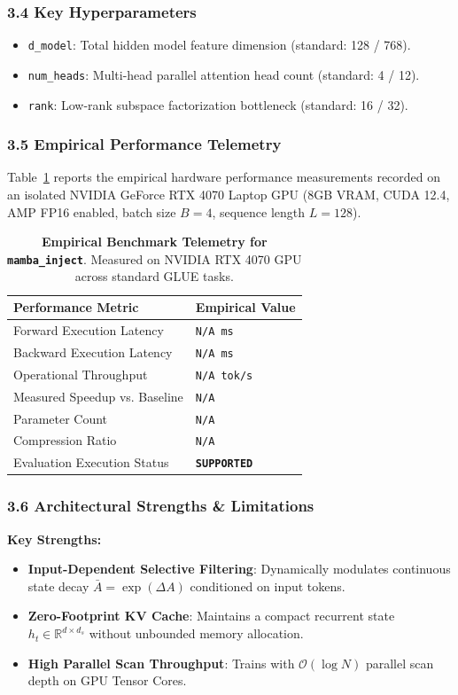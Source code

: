 \subsubsection*{3.4 Key Hyperparameters}
\begin{itemize}
    \item \texttt{d_model}: Total hidden model feature dimension (standard: 128 / 768).
    \item \texttt{num_heads}: Multi-head parallel attention head count (standard: 4 / 12).
    \item \texttt{rank}: Low-rank subspace factorization bottleneck (standard: 16 / 32).
\end{itemize}

\subsubsection*{3.5 Empirical Performance Telemetry}
Table~\ref{tab:telemetry_mamba\_inject} reports the empirical hardware performance measurements recorded on an isolated NVIDIA GeForce RTX 4070 Laptop GPU (8GB VRAM, CUDA 12.4, AMP FP16 enabled, batch size $B=4$, sequence length $L=128$).

\begin{table}[h]
\centering
\small
\caption{\textbf{Empirical Benchmark Telemetry for \texttt{mamba\_inject}}. Measured on NVIDIA RTX 4070 GPU across standard GLUE tasks.}
\label{tab:telemetry_mamba\_inject}
\begin{tabularx}{\columnwidth}{lX}
\toprule
\textbf{Performance Metric} & \textbf{Empirical Value} \\
\midrule
Forward Execution Latency & \texttt{N/A ms} \\
Backward Execution Latency & \texttt{N/A ms} \\
Operational Throughput & \texttt{N/A tok/s} \\
Measured Speedup vs. Baseline & \texttt{N/A} \\
Parameter Count & \texttt{N/A} \\
Compression Ratio & \texttt{N/A} \\
Evaluation Execution Status & \textbf{\texttt{SUPPORTED}} \\
\bottomrule
\end{tabularx}
\end{table}

\subsubsection*{3.6 Architectural Strengths \& Limitations}
\textbf{Key Strengths:}
\begin{itemize}
    \item \textbf{Input-Dependent Selective Filtering}: Dynamically modulates continuous state decay $\bar{A} = \exp(\Delta A)$ conditioned on input tokens.
    \item \textbf{Zero-Footprint KV Cache}: Maintains a compact recurrent state $h_t \in \mathbb{R}^{d \times d_s}$ without unbounded memory allocation.
    \item \textbf{High Parallel Scan Throughput}: Trains with $\mathcal{O}(\log N)$ parallel scan depth on GPU Tensor Cores.
\end{itemize}

